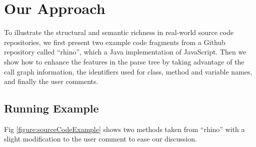 \section{Our Approach}

To illustrate the structural and semantic richness in real-world
source code repositories, we first present two example code fragments
from a Github repository called ``rhino'', which a Java implementation
of JavaScript.
Then we show how to enhance the features in the parse tree by taking
advantage of the call graph information, the identifiers used for
class, method and variable names, and finally the user comments.

\subsection{Running Example}

Fig \ref{figure:sourceCodeExample} shows two methods taken from ``rhino''
with a slight modification to the user comment to ease our discussion.




